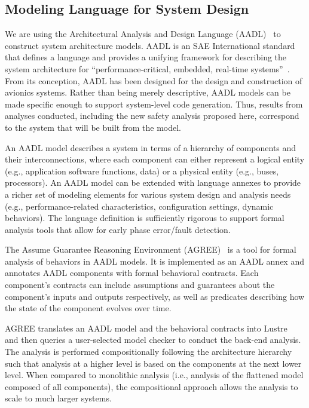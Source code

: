 \subsection{Modeling Language for System Design}
\label{subsec:aadl-agree}
We are using the Architectural Analysis and Design Language (AADL)~\cite{FeilerModelBasedEngineering2012} to construct system architecture models.  AADL is an SAE International standard~\cite{AADL_Standard} that defines a language and provides a unifying framework for describing the system architecture for ``performance-critical, embedded, real-time systems''~\cite{AADL_Standard}. From its conception, AADL has been designed for the design and construction of avionics systems.  Rather than being merely descriptive, AADL models can be made specific enough to support system-level code generation.  Thus, results from analyses conducted, including the new safety analysis proposed here, correspond to the system that will be built from the model.  

An AADL model describes a system in terms of a hierarchy of components and their interconnections, where each component can either represent a logical entity (e.g., application software functions, data) or a physical entity (e.g., buses, processors). An AADL model can be extended with language annexes to provide a richer set of modeling elements for various system design and analysis needs (e.g., performance-related characteristics, configuration settings, dynamic behaviors). The language definition is sufficiently rigorous to support formal analysis tools that allow for early phase error/fault detection.

The Assume Guarantee Reasoning
Environment (AGREE)~\cite{NFM2012:CoGaMiWhLaLu} is a tool for formal analysis of behaviors in AADL models.  It is implemented as an AADL annex and annotates AADL components with formal behavioral contracts. Each component's contracts can include assumptions and guarantees about the component's inputs and outputs respectively, as well as predicates describing how the state of the component evolves over time.

AGREE translates an AADL model and the behavioral contracts into Lustre~\cite{Halbwachs91:IEEE} and then queries a user-selected
model checker to conduct the back-end analysis. The analysis is performed compositionally following the architecture hierarchy such that analysis at a higher level is based on the components at the next lower level.  When compared to monolithic analysis (i.e., analysis of the flattened model composed of all components), the compositional approach allows the analysis to scale to much larger systems. 

